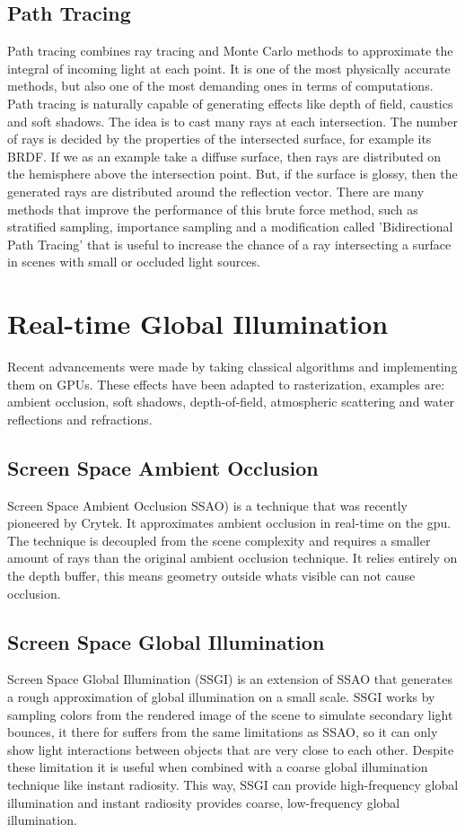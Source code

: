 	\subsection {Path Tracing}
		Path tracing combines ray tracing and Monte Carlo methods to approximate the
		integral of incoming light at each point. It is one of the most physically
		accurate methods, but also one of the most demanding ones in terms of
		computations. Path tracing is naturally capable of generating effects like depth
		of field, caustics and soft shadows. The idea is to cast many rays at each
		intersection. The number of rays is decided by the properties of the intersected
		surface, for example its BRDF. If we as an example take a diffuse surface, then
		rays are distributed on the hemisphere above the intersection point. But, if the
		surface is glossy, then the generated rays are distributed around the reflection
		vector. There are many methods that improve the performance of this brute force
		method, such as stratified sampling, importance sampling and a modification
		called 'Bidirectional Path Tracing' that is useful to increase the chance of a
		ray intersecting a surface in scenes with small or occluded light sources.

	\section {Real-time Global Illumination}  
		Recent advancements were made by taking classical algorithms and implementing them on GPUs. 
		These effects have been adapted to rasterization, examples are: ambient occlusion, soft shadows,
		depth-of-field, atmospheric scattering and water reflections and refractions.

    \subsection {Screen Space Ambient Occlusion}  
		Screen Space Ambient Occlusion SSAO) is a technique that was recently pioneered
		by Crytek. It approximates ambient occlusion in real-time on the gpu. The
		technique is decoupled from the scene complexity and requires a smaller amount
		of rays than the original ambient occlusion technique. It relies entirely on the
		depth buffer, this means geometry outside whats visible can not cause occlusion.

	\subsection {Screen Space Global Illumination}
        Screen Space Global Illumination (SSGI) is an extension of SSAO that generates a rough approximation of global illumination on a small scale. SSGI works by sampling colors from the rendered image of the scene to simulate secondary light bounces, it there for suffers from the same limitations as SSAO, so it can only show light interactions between objects that are very close to each other. Despite these limitation it is useful when combined with a coarse global illumination technique like instant radiosity. This way, SSGI can provide high-frequency global illumination and instant radiosity provides coarse, low-frequency global illumination.

